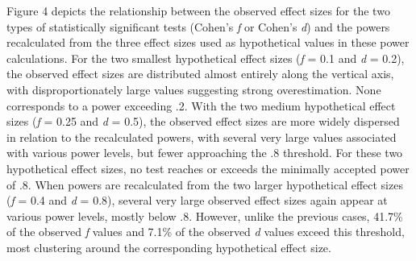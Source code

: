 \documentclass[authordate, meta]{jote-new-article}
\begin{document}
	Figure 4 depicts the relationship between the observed effect sizes for the two types of statistically significant tests (Cohen's \emph{f} or Cohen's \emph{d}) and the powers recalculated from the three effect sizes used as hypothetical values in these power calculations. For the two smallest hypothetical effect sizes (\emph{f} = 0.1 and \emph{d} = 0.2), the observed effect sizes are distributed almost entirely along the vertical axis, with disproportionately large values suggesting strong overestimation. None corresponds to a power exceeding .2. With the two medium hypothetical effect sizes (\emph{f} = 0.25 and \emph{d} = 0.5), the observed effect sizes are more widely dispersed in relation to the recalculated powers, with several very large values associated with various power levels, but fewer approaching the .8 threshold. For these two hypothetical effect sizes, no test reaches or exceeds the minimally accepted power of .8. When powers are recalculated from the two larger hypothetical effect sizes (\emph{f} = 0.4 and \emph{d} = 0.8), several very large observed effect sizes again appear at various power levels, mostly below .8. However, unlike the previous cases, 41.7\% of the observed \emph{f} values and 7.1\% of the observed \emph{d} values exceed this threshold, most clustering around the corresponding hypothetical effect size.

	\newpage
\onecolumn
\end{document}
